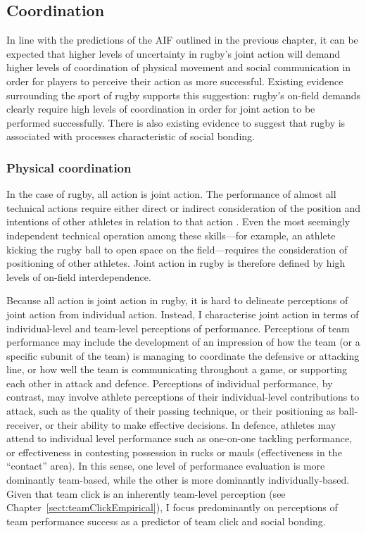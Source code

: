 \begin{CJK}{UTF8}{gbsn}
\subsection{Coordination}
In line with the predictions of the AIF outlined in the previous chapter, it can be expected that higher levels of uncertainty in rugby's joint action will demand higher levels of coordination of physical movement and social communication in order for players to perceive their action as more successful.  Existing evidence surrounding the sport of rugby supports this suggestion: rugby's on-field demands clearly require high levels of coordination in order for joint action to be performed successfully. There is also existing evidence to suggest that rugby is associated with processes characteristic of social bonding.

\subsubsection{Physical coordination\label{sect:onfieldCoordination}}
In the case of rugby, all action is joint action.  The performance of almost all technical actions require either direct or indirect consideration of the position and intentions of other athletes in relation to that action \citep{Downey2012}.  Even the most seemingly independent technical operation among these skills---for example, an athlete kicking the rugby ball to open space on the field---requires the consideration of positioning of other athletes.  Joint action in rugby is therefore defined by high levels of on-field interdependence.

Because all action is joint action in rugby, it is hard to delineate perceptions of joint action from individual action.  Instead, I characterise joint action in terms of individual-level and team-level perceptions of performance. Perceptions of team performance may include the development of an impression of how the team (or a specific subunit of the team) is managing to coordinate the defensive or attacking line, or how well the team is communicating throughout a game, or supporting each other in attack and defence.  Perceptions of individual performance, by contrast, may involve athlete perceptions of their individual-level contributions to attack, such as the quality of their passing technique, or their positioning as ball-receiver, or their ability to make effective decisions.  In defence, athletes may attend to individual level performance such as one-on-one tackling performance, or effectiveness in contesting possession in rucks or mauls (effectiveness in the ``contact'' area).  In this sense, one level of performance evaluation is more dominantly team-based, while the other is more dominantly individually-based.  Given that team click is an inherently team-level perception (see Chapter~\ref{sect:teamClickEmpirical}), I focus predominantly on perceptions of team performance success as a predictor of team click and social bonding.


\end{CJK}

